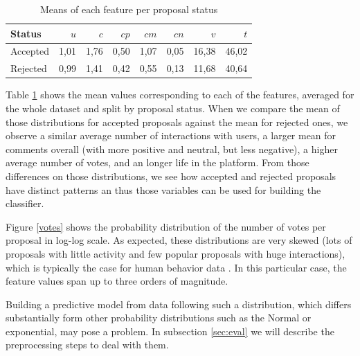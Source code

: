 \begin{table}[H]
\caption{Means of each feature per proposal status }
\label{means}
\centering
\begin{tabular}{l|rrrrrrr}  
\toprule
Status & $u$ & $c$ & $cp$ & $cm$ & $cn$ & $v$ & $t$ \\
\midrule
Accepted	&1,01	&1,76	&0,50	&1,07	&0,05	&16,38	&46,02\\
Rejected	&0,99	&1,41	&0,42	&0,55	&0,13	&11,68	&40,64\\
\bottomrule
\end{tabular}\label{tab:main}
\end{table}

Table \ref{tab:main} shows the mean values corresponding to each of the features, averaged for the whole dataset and split by proposal status. When we compare the mean of those distributions for accepted proposals against the mean for rejected ones, we observe a similar average number of interactions with users, a larger mean for comments overall (with more positive and neutral, but less negative), a higher average number of votes, and an longer life in the platform. From those differences on those distributions, we see how accepted and rejected proposals have distinct patterns an thus those variables can be used for building the classifier.

Figure \ref{votes} shows the probability distribution of the number of votes per proposal in log-log scale. As expected, these distributions are very skewed (lots of proposals with little activity and few popular proposals with huge interactions), which is typically the case for human behavior data \cite{navarro2017temporal}. In this particular case, the feature values span up to three orders of magnitude.

Building a predictive model from data following such a distribution, which differs substantially form other probability distributions such as the Normal or exponential, may pose a problem.
In subsection \ref{sec:eval} we will describe the preprocessing steps to deal with them.

